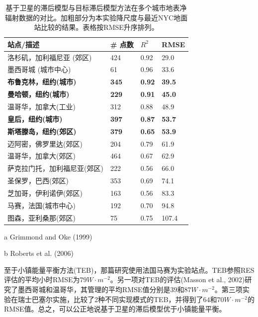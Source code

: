 \documentclass[3p,times]{elsarticle}
\begin{document}
\begin{table}[htb]
    \centering
    \caption{基于卫星的滞后模型与目标滞后模型方法在多个城市地表净辐射数据的对比。加粗部分为本实验降尺度与最近NYC地面站比较的结果。表格按RMSE升序排列。}
    \begin{threeparttable}
    \begin{tabular}{llll}\hline
    站点/描述&\# 点数&$R^2$&RMSE\\\hline 
    洛杉矶，加利福尼亚 (郊区)\tnote{a}&424&0.92&29.0\\
    墨西哥城 (城市中心)\tnote{a}&61&0.96&33.6\\
    \textbf{布鲁克林，纽约(城市)}&\textbf{345}&\textbf{0.92}&\textbf{39.5}\\
    \textbf{曼哈顿，纽约(城市)}&\textbf{229}&\textbf{0.91}&\textbf{45.0}\\
    温哥华，加拿大(工业)\tnote{a}&312&0.88&48.9\\
    \textbf{皇后，纽约(城市)}&\textbf{397}&\textbf{0.87}&\textbf{53.7}\\
    \textbf{斯塔滕岛，纽约(郊区)}&\textbf{379}&\textbf{0.65}&\textbf{53.9}\\
    迈阿密，佛罗里达(郊区)\tnote{a}&204&0.79&61.9\\
    温哥华，加拿大(郊区)\tnote{a}&464&0.67&62.9\\
    萨克拉门托，加利福尼亚(郊区)\tnote{a}&222&0.56&66.0\\
    圣保罗，巴西(郊区)\tnote{a}&353&0.69&74.1\\
    芝加哥，伊利诺伊(郊区)\tnote{a}&163&0.56&83.3\\
    马赛，法国(城市中心)\tnote{b}&192&0.70&94.8\\
    图森，亚利桑那(郊区)\tnote{a}&75&0.75&107.4\\\hline
    \end{tabular}
    \begin{tablenotes}
        \item[a] Grimmond and Oke (1999)
        \item[b] Roberts et al. (2006)
    \end{tablenotes}
    \end{threeparttable}
\end{table}

至于小镇能量平衡方法(TEB)，那篇研究使用法国马赛为实验站点。TEB参照RES评估的平均小时RMSE为$79W\cdot m^{-2}$。另一项对TEB的评估(Masson et al., 2002)研究了墨西哥城和温哥华，其管理的平均RMSE值分别是$39$和$87W\cdot m^{-2}$。第三项实验在瑞士巴塞尔实施，比较了2种不同实现模式的TEB，并得到了$64$和$70W\cdot m^{-2}$的RMSE值。总之，可以公正地说基于卫星的滞后模型优于小镇能量平衡。
\end{document}
